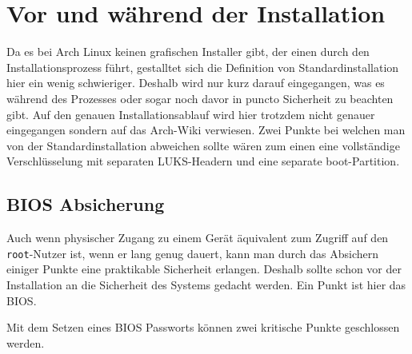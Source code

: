 \section{Vor und während der Installation}\label{sec:physical}
Da es bei Arch Linux keinen grafischen Installer gibt, der einen durch den Installationsprozess führt, gestalltet sich die Definition von Standardinstallation hier ein wenig schwieriger. Deshalb wird nur kurz darauf eingegangen, was es während des Prozesses oder sogar noch davor in puncto Sicherheit zu beachten gibt. Auf den genauen Installationsablauf wird hier trotzdem nicht genauer eingegangen sondern auf das Arch-Wiki verwiesen.\cite{InstallationGuideArchWiki} Zwei Punkte bei welchen man von der Standardinstallation abweichen sollte wären zum einen eine vollständige Verschlüsselung mit separaten \ac{LUKS}-Headern und eine separate boot-Partition.

\subsection{BIOS Absicherung}Auch wenn physischer Zugang zu einem Gerät äquivalent zum Zugriff auf den \texttt{root}-Nutzer ist, wenn er lang genug dauert, kann man durch das Absichern einiger Punkte eine praktikable Sicherheit erlangen.\cite{SecurityArchWiki} Deshalb sollte schon vor der Installation an die Sicherheit des Systems gedacht werden. Ein Punkt ist hier das \ac{BIOS}.

Mit dem Setzen eines \ac{BIOS} Passworts können zwei kritische Punkte geschlossen werden.\cite[S. 15]{RedHatEnterprise2020a}

